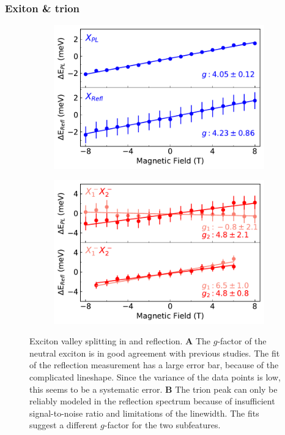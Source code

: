 \subsubsection{Exiton \& trion}

\begin{figure}[t]
	\begin{subfigure}{0.49\textwidth}
		\caption{}
		\includegraphics[width=\textwidth]{G_X}
	\end{subfigure}
	\begin{subfigure}{0.49\textwidth}
		\caption{}
		\includegraphics[width=\textwidth]{G_T}
	\end{subfigure}
	\caption{Exciton valley splitting in \pl and reflection. \textbf{A} The $g$-factor of the neutral exciton is in good agreement with previous studies. The fit of the reflection measurement has a large error bar, because of the complicated lineshape. Since the variance of the data points is low, this seems to be a systematic error. \textbf{B} The trion peak can only be reliably modeled in the reflection spectrum because of insufficient signal-to-noise ratio and limitations of the linewidth. The fits suggest a different $g$-factor for the two subfeatures.}
	\label{X_fits}
\end{figure}

